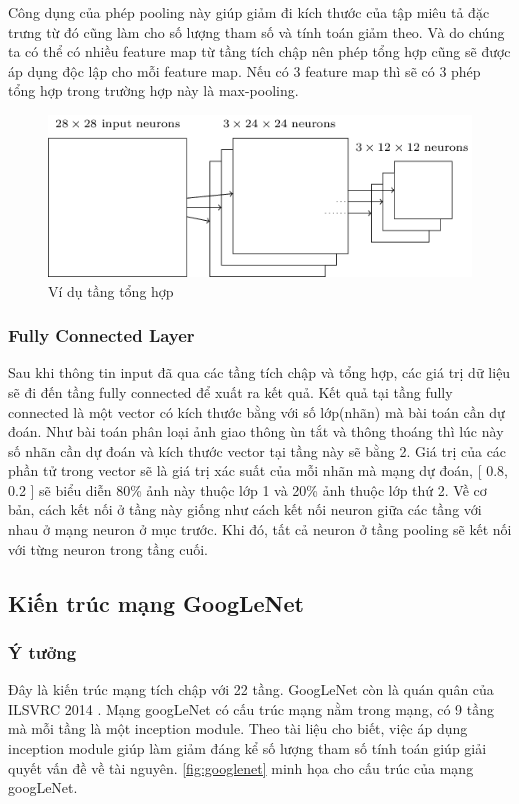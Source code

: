 		Công dụng của phép pooling này giúp giảm đi kích thước của tập miêu tả đặc trưng từ đó cũng làm cho số lượng tham số và tính toán giảm theo. Và do chúng ta có thể có nhiều feature map từ tầng tích chập nên phép tổng hợp cũng sẽ được áp dụng độc lập cho mỗi feature map. Nếu có 3 feature map thì sẽ có 3 phép tổng hợp trong trường hợp này là max-pooling.
		
		\begin{figure}[h!]
			\centering
			\includegraphics[scale=0.5]{charts/pooling_ex.png}
			\caption{Ví dụ tầng tổng hợp \cite{conv-layer}}
			\label{fig:pooling_ex}
		\end{figure}
		
	
	\subsubsection{Fully Connected Layer}
		Sau khi thông tin input đã qua các tầng tích chập và tổng hợp, các giá trị dữ liệu sẽ đi đến tầng fully connected để xuất ra kết quả. Kết quả tại tầng fully connected là một vector có kích thước bằng với số lớp(nhãn) mà bài toán cần dự đoán. Như bài toán phân loại ảnh giao thông ùn tắt và thông thoáng thì lúc này số nhãn cần dự đoán và kích thước vector tại tầng này sẽ bằng 2. Giá trị của các phần tử trong vector sẽ là giá trị xác suất của mỗi nhãn mà mạng dự đoán, [ 0.8, 0.2 ] sẽ biểu diễn 80\% ảnh này thuộc lớp 1 và 20\% ảnh thuộc lớp thứ 2. Về cơ bản, cách kết nối ở tầng này giống như cách kết nối neuron giữa các tầng với nhau ở mạng neuron ở mục trước. Khi đó, tất cả neuron ở tầng pooling sẽ kết nối với từng neuron trong tầng cuối.
	
\subsection{Kiến trúc mạng GoogLeNet}
	
	\subsubsection{Ý tưởng}
	Đây là kiến trúc mạng tích chập với 22 tầng. GoogLeNet còn là quán quân của ILSVRC 2014 \cite{1}. Mạng googLeNet có cấu trúc mạng nằm trong mạng, có 9 tầng mà mỗi tầng là một inception module. Theo tài liệu cho biết, việc áp dụng inception module giúp làm giảm đáng kể số lượng tham số tính toán giúp giải quyết vấn đề về tài nguyên. \ref{fig:googlenet} minh họa cho cấu trúc của mạng googLeNet.
	
